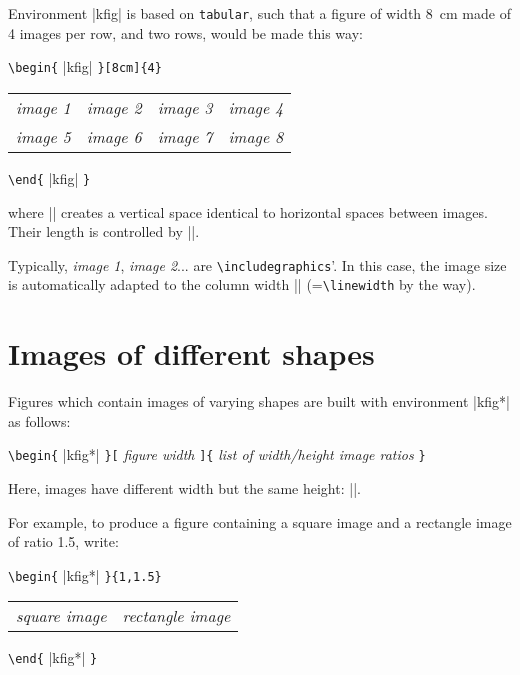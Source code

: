 \documentclass[12pt,a4paper]{article}
\begin{document}
Environment {\emphverb|kfig|} is based on \verb|tabular|, such that a figure of width 8~cm made of 4 images per row, and two rows, would be made this way:
\begin{kcode}
\begin{minipage}{.8\linewidth}
\verb|\begin{|%
{\emphverb|kfig|}%
\verb|}[8cm]{4}|%

\begin{tabular}{l@{\texttt{~\&~}}l@{\texttt{~\&~}}l@{\texttt{~\&~}}l}
\emph{image 1} &
\emph{image 2} &
\emph{image 3} &
\emph{image 4} \quad {\emphverb|\kskip|} \\
\emph{image 5} &
\emph{image 6} &
\emph{image 7} &
\emph{image 8}
\end{tabular}

\verb|\end{|%
{\emphverb|kfig|}%
\verb|}|%
\end{minipage}
\end{kcode}
where {\emphverb|\kskip|} creates a vertical space identical to horizontal spaces between images.
Their length is controlled by {\emphverb|\kimgsep|}.

Typically, \emph{image 1}, \emph{image 2}... are \verb|\includegraphics|'.
In this case, the image size is automatically adapted to the column width {\emphverb|\kimgw|} (=\verb|\linewidth| by the way).


\section{Images of different shapes}

Figures which contain images of varying shapes are built with environment {\emphverb|kfig*|} as follows:
\begin{kcode}
\verb|\begin{|%
{\emphverb|kfig*|}%
\verb|}[|%
\emph{figure width}%
\verb|]{|%
\emph{list of width/height image ratios}%
\verb|}|%
\end{kcode}
Here, images have different width but the same height: {\emphverb|\kimgh|}.

For example, to produce a figure containing a square image and a rectangle image of ratio 1.5, write:
\begin{kcode}
\begin{minipage}{.8\linewidth}
\verb|\begin{|%
{\emphverb|kfig*|}%
\verb|}{1,1.5}|%

\begin{tabular}{l@{\texttt{~\&~}}l}
\emph{square image} &
\emph{rectangle image}
\end{tabular}

\verb|\end{|%
{\emphverb|kfig*|}%
\verb|}|%
\end{minipage}
\end{kcode}
\end{document}
